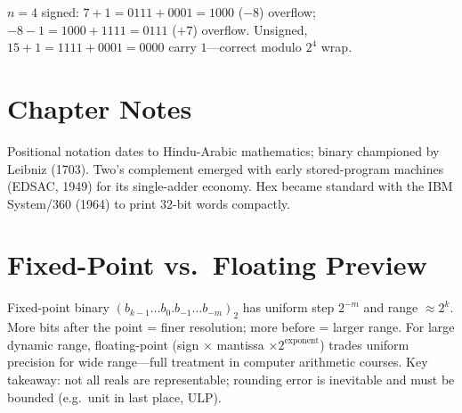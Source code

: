 \begin{example}
$n=4$ signed: $7+1=0111+0001=1000$ ($-8$) overflow; $-8-1=1000+1111=0111$ ($+7$) overflow.
Unsigned, $15+1=1111+0001=0000$ carry $1$---correct modulo $2^4$ wrap.
\end{example}


\section{Chapter Notes}
Positional notation dates to Hindu-Arabic mathematics; binary championed by Leibniz (1703).
Two's complement emerged with early stored-program machines (EDSAC, 1949) for its single-adder economy.
Hex became standard with the IBM System/360 (1964) to print 32-bit words compactly.

\section{Fixed-Point vs.\ Floating Preview}
Fixed-point binary $(b_{k-1}\dots b_0.b_{-1}\dots b_{-m})_2$ has uniform step $2^{-m}$ and range $\approx2^k$.
More bits after the point = finer resolution; more before = larger range. For large dynamic range,
floating-point (sign $\times$ mantissa $\times2^{\text{exponent}}$) trades uniform precision for wide range---full
treatment in computer arithmetic courses. Key takeaway: not all reals are representable; rounding error is inevitable
and must be bounded (e.g.\ unit in last place, ULP).


